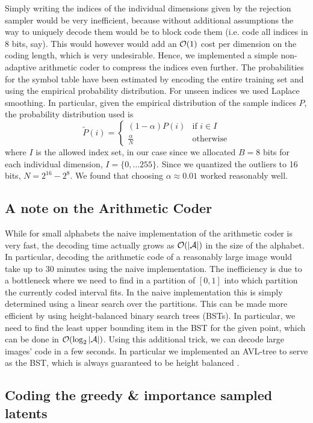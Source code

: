 \par
Simply writing the indices of the individual dimensions given by the rejection
sampler would be very inefficient, because without additional assumptions the
way to uniquely decode them would be to block code them (i.e. code all indices
in 8 bits, say). This would however would add an $\mathcal{O}(1)$ cost per dimension on
the coding length, which is very undesirable. Hence, we implemented a simple
non-adaptive arithmetic coder \cite{rissanen1981universal} to compress the 
indices even further. The
probabilities for the symbol table have been estimated  by encoding the entire
training set and using the empirical probability distribution. For unseen
indices we used Laplace smoothing. In particular, given the empirical
distribution of the sample indices $P$, the probability distribution
used is
\[
  \tilde{P}(i) = \begin{cases}
    (1 - \alpha)P(i) & \text{if } i \in I \\
    \frac{\alpha}{N} & \text{otherwise}
    \end{cases}
\]
where $I$ is the allowed index set, in our case since we allocated $B = 8$ bits
for each individual dimension, $I = \{0, \hdots 255\}$. Since we quantized the
outliers to 16 bits, $N = 2^{16} - 2^{8}$. We found that choosing $\alpha
\approx 0.01$ worked reasonably well.
\subsection{A note on the Arithmetic Coder}
\par
While for small alphabets the naive implementation of the arithmetic coder is
very fast, the decoding time actually grows as $\mathcal{O}(|\mathcal{A}|)$ in the size of the
alphabet. In particular, decoding the arithmetic code of a reasonably large
image would take up to 30 minutes using the naive implementation. The
inefficiency is due to a bottleneck where we need to find in a partition of $[0,
1]$ into which partition the currently coded interval fits. In the naive
implementation this is simply determined using a linear search over the
partitions. This can be made more efficient by using height-balanced binary
search trees (BSTs). In particular, we need to find the least upper bounding
item in the BST for the given point, which can be done in $\mathcal{O}(\log_2|\mathcal{A}|)$.
Using this additional trick, we can decode large images' code in a few seconds.
In particular we implemented an AVL-tree to serve as the BST, which is always
guaranteed to be height balanced \cite{adel1962algorithm}.
\subsection{Coding the greedy \& importance sampled latents}
\par
